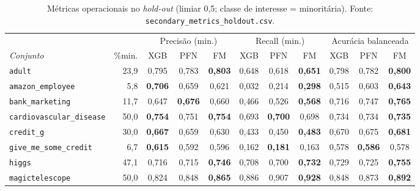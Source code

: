 
\begin{table}[htbp]
\centering
\footnotesize
\setlength{\tabcolsep}{3.5pt}
\caption[Métricas operacionais no \emph{hold-out} --- binárias]{Métricas operacionais no \emph{hold-out} (limiar 0,5; classe de interesse = minoritária). Fonte: \texttt{secondary\_metrics\_holdout.csv}.}
\label{tab:app-operacionais}
\begin{tabular}{lr ccc ccc ccc}
\toprule
 & & \multicolumn{3}{c}{Precisão (min.)} & \multicolumn{3}{c}{Recall (min.)} & \multicolumn{3}{c}{Acurácia balanceada} \\
\cmidrule(lr){3-5}\cmidrule(lr){6-8}\cmidrule(lr){9-11}
\emph{Conjunto} & \%min. & XGB & PFN & FM & XGB & PFN & FM & XGB & PFN & FM \\
\midrule
\texttt{adult} & 23{,}9 & 0{,}795 & 0{,}783 & \textbf{0{,}803} & 0{,}648 & 0{,}618 & \textbf{0{,}651} & 0{,}798 & 0{,}782 & \textbf{0{,}800} \\
\texttt{amazon\_\allowbreak employee} & 5{,}8 & \textbf{0{,}706} & 0{,}659 & 0{,}621 & 0{,}032 & 0{,}214 & \textbf{0{,}298} & 0{,}515 & 0{,}603 & \textbf{0{,}643} \\
\texttt{bank\_\allowbreak marketing} & 11{,}7 & 0{,}647 & \textbf{0{,}676} & 0{,}660 & 0{,}466 & 0{,}526 & \textbf{0{,}568} & 0{,}716 & 0{,}747 & \textbf{0{,}765} \\
\texttt{cardiovascular\_\allowbreak disease} & 50{,}0 & \textbf{0{,}754} & 0{,}751 & \textbf{0{,}754} & 0{,}693 & \textbf{0{,}700} & 0{,}698 & 0{,}734 & 0{,}734 & \textbf{0{,}735} \\
\texttt{credit\_\allowbreak g} & 30{,}0 & \textbf{0{,}667} & 0{,}659 & 0{,}630 & 0{,}433 & 0{,}450 & \textbf{0{,}483} & 0{,}670 & 0{,}675 & \textbf{0{,}681} \\
\texttt{give\_\allowbreak me\_\allowbreak some\_\allowbreak credit} & 6{,}7 & \textbf{0{,}615} & 0{,}592 & 0{,}596 & 0{,}162 & \textbf{0{,}181} & 0{,}163 & 0{,}578 & \textbf{0{,}586} & 0{,}578 \\
\texttt{higgs} & 47{,}1 & 0{,}716 & 0{,}715 & \textbf{0{,}746} & 0{,}708 & 0{,}700 & \textbf{0{,}732} & 0{,}729 & 0{,}725 & \textbf{0{,}755} \\
\texttt{magictelescope} & 50{,}0 & 0{,}824 & 0{,}848 & \textbf{0{,}865} & 0{,}886 & 0{,}907 & \textbf{0{,}928} & 0{,}848 & 0{,}873 & \textbf{0{,}892} \\

\end{tabular}
\end{table}
